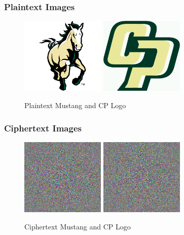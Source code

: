 \documentclass[11pt]{article}
\begin{document}
    \subsubsection{Plaintext Images}
      \begin{figure}[ht!p]
        \centering
        \includegraphics[width=4cm]{Images/mustang.jpg}
        \includegraphics[width=4cm]{Images/cp-logo.jpg}
        \caption{Plaintext Mustang and CP Logo}
        \label{fig:Plaintext_Images_Task4}
      \end{figure}

    \subsubsection{Ciphertext Images}
      \begin{figure}[ht!p]
        \centering
        \includegraphics[width=4cm]{Images/mustang-2tp.jpg}
        \includegraphics[width=4cm]{Images/cp-logo-2tp.jpg}
        \caption{Ciphertext Mustang and CP Logo}
        \label{fig:Ciphertext_Images_Task4}
      \end{figure}
  
\end{document}
